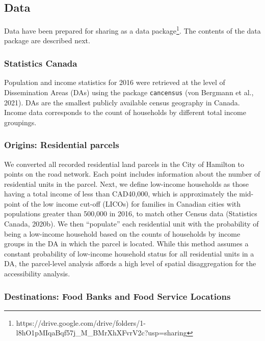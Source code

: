 \documentclass[]{elsarticle} %
\begin{document}
\hypertarget{data}{%
\subsection{Data}\label{data}}

Data have been prepared for sharing as a data package\footnote{https://drive.google.com/drive/folders/1-l8hO1pMIqaBqf57j\_M\_BMrXhXFvrV2c?usp=sharing}.
The contents of the data package are described next.

\hypertarget{statistics-canada}{%
\subsubsection{Statistics Canada}\label{statistics-canada}}

Population and income statistics for 2016 were retrieved at the level of
Dissemination Areas (DAs) using the package \texttt{cancensus} (von
Bergmann et al., 2021). DAs are the smallest publicly available census
geography in Canada. Income data corresponds to the count of households
by different total income groupings.

\hypertarget{origins-residential-parcels}{%
\subsubsection{Origins: Residential
parcels}\label{origins-residential-parcels}}

We converted all recorded residential land parcels in the City of
Hamilton to points on the road network. Each point includes information
about the number of residential units in the parcel. Next, we define
low-income households as those having a total income of less than
CAD40,000, which is approximately the mid-point of the low income
cut-off (LICOs) for families in Canadian cities with populations greater
than 500,000 in 2016, to match other Census data (Statistics Canada,
2020b). We then ``populate'' each residential unit with the probability
of being a low-income household based on the counts of households by
income groups in the DA in which the parcel is located. While this
method assumes a constant probability of low-income household status for
all residential units in a DA, the parcel-level analysis affords a high
level of spatial disaggregation for the accessibility analysis.

\hypertarget{destinations-food-banks-and-food-service-locations}{%
\subsubsection{Destinations: Food Banks and Food Service
Locations}\label{destinations-food-banks-and-food-service-locations}}
\end{document}
